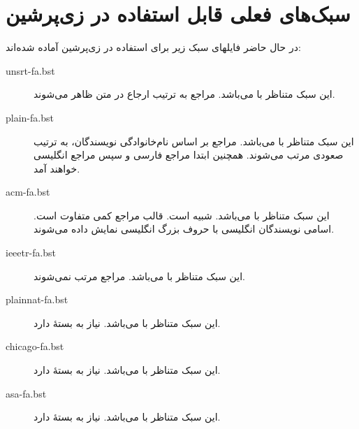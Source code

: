 \documentclass{article}
\theoremstyle{plain}\newtheorem{question}{پرسش}
\begin{document}
\section{سبک‌های فعلی قابل استفاده در زی‌پرشین}
در حال حاضر فایلهای سبک زیر برای استفاده در زی‌پرشین آماده شده‌اند:
\begin{description}
\item [unsrt-fa.bst] این سبک متناظر با  می‌باشد. مراجع به ترتیب ارجاع در متن ظاهر می‌شوند.
\item [plain-fa.bst] این سبک متناظر با  می‌باشد. مراجع بر اساس نام‌خانوادگی نویسندگان، به ترتیب صعودی مرتب می‌شوند.
 همچنین ابتدا مراجع فارسی و سپس مراجع انگلیسی خواهند آمد.
\item [acm-fa.bst] این سبک متناظر با  می‌باشد. شبیه  است.  قالب مراجع کمی متفاوت است. اسامی نویسندگان انگلیسی با حروف بزرگ انگلیسی نمایش داده می‌شوند.
\item [ieeetr-fa.bst] این سبک متناظر با  می‌باشد. مراجع مرتب نمی‌شوند.
\item [plainnat-fa.bst] این سبک متناظر با  می‌باشد. نیاز به بستهٔ  دارد.
\item [chicago-fa.bst] این سبک متناظر با  می‌باشد. نیاز به بستهٔ  دارد.
\item [asa-fa.bst] این سبک متناظر با  می‌باشد. نیاز به بستهٔ  دارد.
\end{description}
\end{document}
